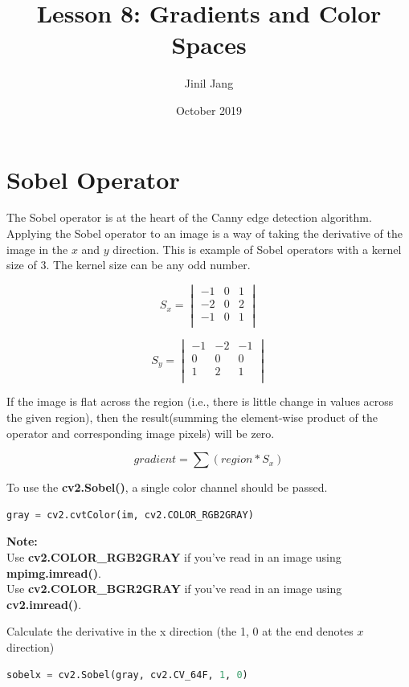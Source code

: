 \documentclass[12pt]{article}
\title{Lesson 8: Gradients and Color Spaces}
\author{Jinil Jang }
\date{October 2019}
\begin{document}
\maketitle

\section{Sobel Operator}

The Sobel operator is at the heart of the Canny edge detection algorithm. Applying the Sobel operator to an image is a way of taking the derivative of the image in the $x$ and $y$ direction. This is example of Sobel operators with a kernel size of 3. The kernel size can be any odd number.

$$S_x = 
\begin{vmatrix}
-1&0&1\\
-2&0&2\\
-1&0&1\\
\end{vmatrix}
$$

$$S_y = 
\begin{vmatrix}
-1&-2&-1\\
0&0&0\\
1&2&1\\
\end{vmatrix}
$$

If the image is flat across the region (i.e., there is little change in values across the given region), then the result(summing the element-wise product of the operator and corresponding image pixels) will be zero.

$$gradient = \sum (region * S_x)$$

To use the \textbf{cv2.Sobel()}, a single color channel should be passed.

\begin{lstlisting}[language=Python]
gray = cv2.cvtColor(im, cv2.COLOR_RGB2GRAY)
\end{lstlisting}

\textbf{Note: } \\
Use \textbf{cv2.COLOR\_RGB2GRAY} if you've read in an image using \textbf{mpimg.imread()}. \\
Use \textbf{cv2.COLOR\_BGR2GRAY} if you've read in an image using \textbf{cv2.imread()}.

Calculate the derivative in the x direction (the 1, 0 at the end denotes $x$ direction)

\begin{lstlisting}[language=Python]
sobelx = cv2.Sobel(gray, cv2.CV_64F, 1, 0)
\end{lstlisting}
\end{document}
